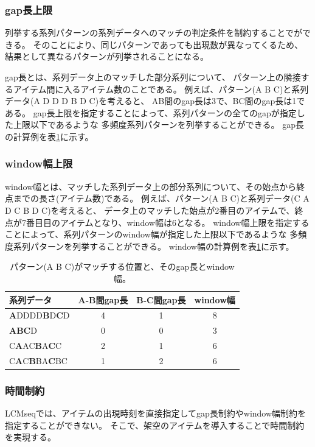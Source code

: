 \documentclass[a4paper]{jarticle}
\begin{document}
\subsubsection*{gap長上限}
列挙する系列パターンの系列データへのマッチの判定条件を制約することでができる。
そのことにより、同じパターンであっても出現数が異なってくるため、
結果として異なるパターンが列挙されることになる。

gap長とは、系列データ上のマッチした部分系列について、
パターン上の隣接するアイテム間に入るアイテム数のことである。
例えば、パターン(A B C)と系列データ(A D D D B D C)を考えると、
AB間のgap長は3で、BC間のgap長は1である。
gap長上限を指定することによって、系列パターンの全てのgapが指定した上限以下であるような
多頻度系列パターンを列挙することができる。
gap長の計算例を表\ref{tbl:gapwin}に示す。

\subsubsection*{window幅上限}
window幅とは、マッチした系列データ上の部分系列について、その始点から終点までの長さ(アイテム数)である。
例えば、パターン(A B C)と系列データ(C A D C B D C)を考えると、
データ上のマッチした始点が2番目のアイテムで、終点が7番目目のアイテムとなり、window幅は6となる。
window幅上限を指定することによって、系列パターンのwindow幅が指定した上限以下であるような
多頻度系列パターンを列挙することができる。
window幅の計算例を表\ref{tbl:gapwin}に示す。

\begin{table}[htbp]
\begin{center}
\caption{パターン(A B C)がマッチする位置と、そのgap長とwindow幅。\label{tbl:gapwin}}
\begin{tabular}{lccc}
\hline
系列データ & A-B間gap長 & B-C間gap長 & window幅 \\
\hline
{\bf A}DDDD{\bf B}D{\bf C}D & 4 & 1 & 8 \\
{\bf ABC}D & 0 & 0 & 3 \\
C{\bf A}AC{\bf B}A{\bf C}C & 2 & 1 & 6\\
C{\bf A}C{\bf B}BA{\bf C}BC & 1 & 2 & 6\\
\hline
\end{tabular} 
\end{center}
\end{table} 

\subsubsection*{時間制約}
LCMseqでは、アイテムの出現時刻を直接指定してgap長制約やwindow幅制約を指定することができない。
そこで、架空のアイテムを導入することで時間制約を実現する。
\end{document}
